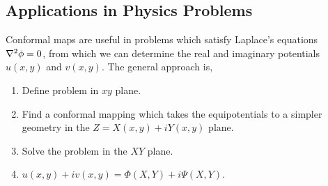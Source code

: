\documentclass{book}
\begin{document}
\subsection{Applications in Physics Problems}
Conformal maps are useful in problems which satisfy Laplace's equations $\laplacian{\phi} = 0$, from which we can determine the real and imaginary potentials $u(x,y)$ and $v(x,y)$. The general approach is,
\begin{enumerate}
	\item Define problem in $xy$ plane.
	\item Find a conformal mapping which takes the equipotentials to a simpler geometry in the $Z = X(x,y) + iY(x,y)$ plane.
	\item Solve the problem in the $XY$ plane. 
	\item $u(x,y) + i v(x,y) = \Phi(X,Y) + i\Psi(X,Y)$.
\end{enumerate}
\end{document}

